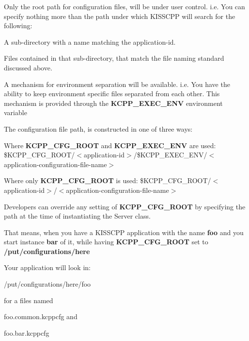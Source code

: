 \begin{DoxyEnumerate}
\item Only the root path for configuration files, will be under user control. i.\-e. You can specify nothing more than the path under which K\-I\-S\-S\-C\-P\-P will search for the following\-:
\begin{DoxyItemize}
\item A sub-\/directory with a name matching the application-\/id.
\item Files contained in that sub-\/directory, that match the file naming standard discussed above.
\end{DoxyItemize}
\item A mechanism for environment separation will be available. i.\-e. You have the ability to keep environment specific files separated from each other. This mechanism is provided through the {\bfseries K\-C\-P\-P\-\_\-\-E\-X\-E\-C\-\_\-\-E\-N\-V} environment variable
\end{DoxyEnumerate}

The configuration file path, is constructed in one of three ways\-:


\begin{DoxyItemize}
\item Where {\bfseries K\-C\-P\-P\-\_\-\-C\-F\-G\-\_\-\-R\-O\-O\-T} and {\bfseries K\-C\-P\-P\-\_\-\-E\-X\-E\-C\-\_\-\-E\-N\-V} are used\-: \$\-K\-C\-P\-P\-\_\-\-C\-F\-G\-\_\-\-R\-O\-O\-T/$<$application-\/id$>$/\$\-K\-C\-P\-P\-\_\-\-E\-X\-E\-C\-\_\-\-E\-N\-V/$<$application-\/configuration-\/file-\/name$>$
\item Where only {\bfseries K\-C\-P\-P\-\_\-\-C\-F\-G\-\_\-\-R\-O\-O\-T} is used\-: \$\-K\-C\-P\-P\-\_\-\-C\-F\-G\-\_\-\-R\-O\-O\-T/$<$application-\/id$>$/$<$application-\/configuration-\/file-\/name$>$
\item Developers can override any setting of {\bfseries K\-C\-P\-P\-\_\-\-C\-F\-G\-\_\-\-R\-O\-O\-T} by specifying the path at the time of instantiating the Server class.
\end{DoxyItemize}

That means, when you have a K\-I\-S\-S\-C\-P\-P application with the name {\bfseries foo} and you start instance {\bfseries bar} of it, while having {\bfseries K\-C\-P\-P\-\_\-\-C\-F\-G\-\_\-\-R\-O\-O\-T} set to {\bfseries /put/configurations/here}

Your application will look in\-:
\begin{DoxyItemize}
\item /put/configurations/here/foo
\item for a files named
\begin{DoxyItemize}
\item foo.\-common.\-kcppcfg and
\item foo.\-bar.\-kcppcfg
\end{DoxyItemize}
\end{DoxyItemize}

